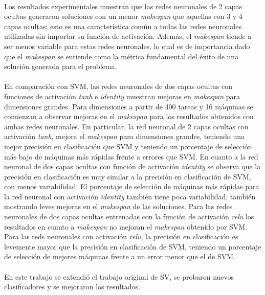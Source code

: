 \paragraph{}Los resultados experimentales muestran que las redes neuronales de 2 capas ocultas generaron soluciones con un menor \textit{makespan} que aquellas con 3 y 4 capas ocultas; esto es una característica común a todas las redes neuronales utilizadas sin importar su función de activación.
Además, el \textit{makespan} tiende a ser menos variable para estas redes neuronales, lo cual es de importancia dado que el \textit{makespan} se entiende como la métrica fundamental del éxito de una solución generada para el problema.

\paragraph{}En comparación con SVM, las redes neuronales de dos capas ocultas con funciones de activación \textit{tanh} e \textit{identity} muestran mejoras en \textit{makespan} para dimensiones grandes.
Para dimensiones a partir de 400 tareas y 16 máquinas se comienzan a observar mejoras en el \textit{makespan} para los resultados obtenidos con ambas redes neuronales.
En particular, la red neuronal de 2 capas ocultas con activación \textit{tanh}, mejora el \textit{makespan} para dimensiones grandes, teniendo una mejor precisión en clasificación que SVM y teniendo un porcentaje de selección más bajo de máquinas más rápidas frente a errores que SVM.
En cuanto a la red neuronal de dos capas ocultas con función de activación \textit{identity} se observa que la precisión en clasificación es muy similar a la precisión en clasificación de SVM, con menos variabilidad. El porcentaje de selección de máquinas más rápidas para la red neuronal con activación \textit{identity} también tiene poca variabilidad, también mostrando leves mejoras en el \textit{makespan} de las soluciones.
Para las redes neuronales de dos capas ocultas entrenadas con la función de activación \textit{relu} los resultados en cuanto a \textit{makespan} no mejoran el \textit{makespan} obtenido por SVM. Para las reds neuronales con activación \textit{relu}, la precisión en clasificación es levemente mayor que la precisión en clasificación de SVM, teniendo un porcentaje de selección de mejores máquinas frente a un error menor que el de SVM.

\paragraph{}En este trabajo se extendió el trabajo original de SV, se probaron nuevos clasificadores y se mejoraron los resultados.

